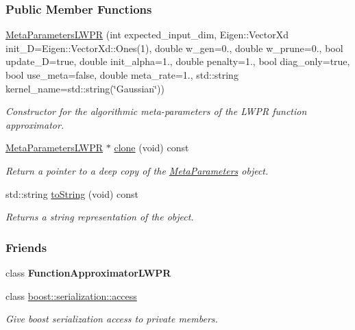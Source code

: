 \subsubsection*{Public Member Functions}
\begin{DoxyCompactItemize}
\item 
\hyperlink{classDmpBbo_1_1MetaParametersLWPR_ab1b0e2e29f5b63194a8cde678b8cb398}{Meta\+Parameters\+L\+W\+P\+R} (int expected\+\_\+input\+\_\+dim, Eigen\+::\+Vector\+Xd init\+\_\+\+D=Eigen\+::\+Vector\+Xd\+::\+Ones(1), double w\+\_\+gen=0., double w\+\_\+prune=0., bool update\+\_\+\+D=true, double init\+\_\+alpha=1., double penalty=1., bool diag\+\_\+only=true, bool use\+\_\+meta=false, double meta\+\_\+rate=1., std\+::string kernel\+\_\+name=std\+::string(\char`\"{}Gaussian\char`\"{}))
\begin{DoxyCompactList}\small\item\em Constructor for the algorithmic meta-\/parameters of the L\+W\+P\+R function approximator. \end{DoxyCompactList}\item 
\hyperlink{classDmpBbo_1_1MetaParametersLWPR}{Meta\+Parameters\+L\+W\+P\+R} $\ast$ \hyperlink{classDmpBbo_1_1MetaParametersLWPR_a5368165b50eff9fef1a99e397048f284}{clone} (void) const 
\begin{DoxyCompactList}\small\item\em Return a pointer to a deep copy of the \hyperlink{classDmpBbo_1_1MetaParameters}{Meta\+Parameters} object. \end{DoxyCompactList}\item 
std\+::string \hyperlink{classDmpBbo_1_1MetaParametersLWPR_a1aca816b42cf0d36118be0ab91120d77}{to\+String} (void) const 
\begin{DoxyCompactList}\small\item\em Returns a string representation of the object. \end{DoxyCompactList}\end{DoxyCompactItemize}
\subsubsection*{Friends}
\begin{DoxyCompactItemize}
\item 
\hypertarget{classDmpBbo_1_1MetaParametersLWPR_aaf11ea813243d01fb6c3c79a88777fea}{class {\bfseries Function\+Approximator\+L\+W\+P\+R}}\label{classDmpBbo_1_1MetaParametersLWPR_aaf11ea813243d01fb6c3c79a88777fea}

\item 
class \hyperlink{classDmpBbo_1_1MetaParametersLWPR_ac98d07dd8f7b70e16ccb9a01abf56b9c}{boost\+::serialization\+::access}
\begin{DoxyCompactList}\small\item\em Give boost serialization access to private members. \end{DoxyCompactList}\end{DoxyCompactItemize}
